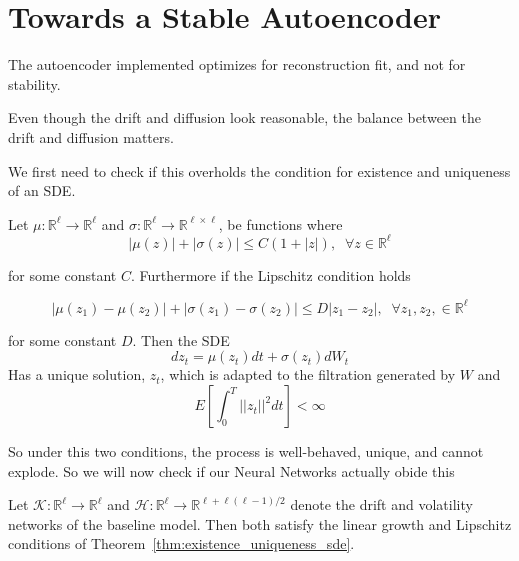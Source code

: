 \chapter{Towards a Stable Autoencoder}
\label{chap:stable_ae}


The autoencoder implemented optimizes for reconstruction fit, and not for stability. 

Even though the drift and diffusion look reasonable, the balance between the drift and diffusion matters. 


We first need to check if this overholds the condition for existence and uniqueness of an SDE.

\begin{theorem}
\label{thm:existence_uniqueness_sde}
 Let $\mu:\mathbb{R}^\ell\rightarrow\mathbb{R}^\ell$ and $\sigma:\mathbb{R}^\ell\rightarrow\mathbb{R}^{\ell\times\ell}$, be functions where
$$|\mu(z)|+|\sigma(z)|\leq C(1+|z|),\;\;\forall z\in\mathbb{R}^\ell$$

for some constant $C$. Furthermore if the Lipschitz condition holds

$$|\mu(z_1)-\mu(z_2)|+|\sigma(z_1)-\sigma(z_2)|\leq D|z_1-z_2|,\;\;\forall z_1, z_2,\in\mathbb{R}^\ell$$

for some constant $D$. Then the SDE
$$dz_t=\mu(z_t)dt+\sigma(z_t)dW_t$$
Has a unique solution, $z_t$, which is adapted to the filtration generated by $W$ and
$$E\left[\int_0^T||z_t||^2dt\right]<\infty$$       
\end{theorem}




So under this two conditions, the process is well-behaved, unique, and cannot explode. So we will now check if our Neural Networks actually obide this


\begin{proposition}
Let $\mathcal{K}: \mathbb{R}^\ell \to \mathbb{R}^\ell$ and 
$\mathcal{H}: \mathbb{R}^\ell \to \mathbb{R}^{\ell + \ell(\ell-1)/2}$ denote the drift 
and volatility networks of the baseline model. Then both satisfy the linear growth 
and Lipschitz conditions of Theorem~\ref{thm:existence_uniqueness_sde}.
\end{proposition}


